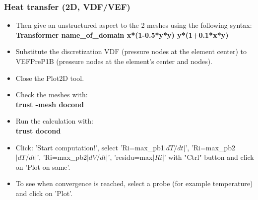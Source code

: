\documentclass[10pt, hyperref={unicode=true,pdfusetitle, bookmarks=true,bookmarksnumbered=false,bookmarksopen=false, breaklinks=false,pdfborder={0 0 1},backref=true,colorlinks=true,linkcolor=darkblue,pageanchor}]{beamer}
\begin{document}
\begin{frame}
\frametitle{Heat transfer (2D, VDF/VEF)}
\begin{block}{}

\begin{itemize}
\item Then give an unstructured aspect to the 2 meshes using the following syntax: \\
\textbf{Transformer name\_of\_domain \; x*(1-0.5*y*y) \; y*(1+0.1*x*y)}

\item Substitute the discretization VDF (pressure nodes at the element center) to VEFPreP1B (pressure nodes at the element's center and nodes).

\item Close the Plot2D tool.

\item Check the meshes with: \\
\textbf{trust -mesh docond}

\item Run the calculation with:\\
\textbf{trust docond }

\item Click: 'Start computation!', select 'Ri=max\_pb1$|dT/dt|$', 'Ri=max\_pb2$|dT/dt|$', 'Ri=max\_pb2$|dV/dt|$', 'residu=max$|Ri|$' with "Ctrl" button and click on 'Plot on same'.

\item To see when convergence is reached, select a probe (for example temperature) and click on 'Plot'. 
\end{itemize}

\end{block}
\end{frame}
\end{document}
